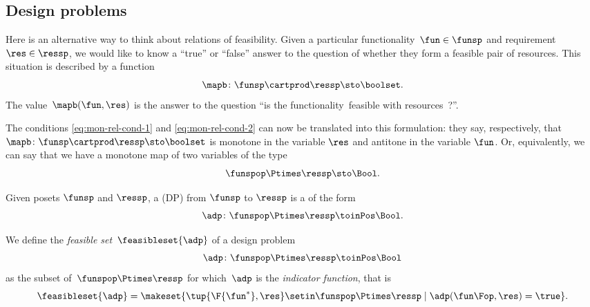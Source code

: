 \subsection[Design problems]{Design problems}
\label{sec:dpdefinition}

Here is an alternative way to think about relations of feasibility. Given a particular functionality~$\fun \in \funsp$ and requirement~$\res \in \ressp$, we would like to know a ``true'' or ``false'' answer to the question of whether they form a feasible pair of resources. This situation is described by a function
%
\begin{equation}
    \mapb\colon \funsp \cartprod \ressp \sto \boolset.
\end{equation}
%
The value~$\mapb(\fun, \res)$ is the answer to the question ``is the functionality~\fun feasible with resources~\res?''.

The conditions \cref{eq:mon-rel-cond-1} and \cref{eq:mon-rel-cond-2} can now be translated into this formulation: they say, respectively, that $\mapb\colon \funsp \cartprod \ressp \sto \boolset$ is monotone in the variable $\res$ and antitone in the variable $\fun$. Or, equivalently, we can say that we have a monotone map of two variables of the type
\begin{equation}
     \funspop \Ptimes \ressp \sto \Bool.
\end{equation}




\begin{definition}
    \label{def:design-problem}
    Given posets $\funsp$ and $\ressp$, a  (DP) from $\funsp$ to $\ressp$ is a  of the form%
    \begin{equation}
        \label{eq:design_prob_as_monfun}
        \adp \colon \funspop \Ptimes \ressp \toinPos \Bool.
    \end{equation}
\end{definition}

\begin{definition}
    \label{def:dp-feasible-set}
    We define the \emph{feasible set}~$\feasibleset{\adp}$ of a design problem
    \begin{equation}
        \label{eq:generic-design-prob}
        \adp\colon \funspop \Ptimes \ressp \toinPos \Bool
    \end{equation}
    as the subset of~$\funspop\Ptimes \ressp$ for which~$\adp$ is the \emph{indicator function}, that is%
    \begin{equation}
        \label{eq:design-prob-as-upper-set}
        \feasibleset{\adp} = \makeset{ \tup{\F{\fun^*},\res} \setin \funspop\Ptimes \ressp \mid %
            \adp(\fun\Fop, \res) = \true %
        }.
    \end{equation}
\end{definition}

